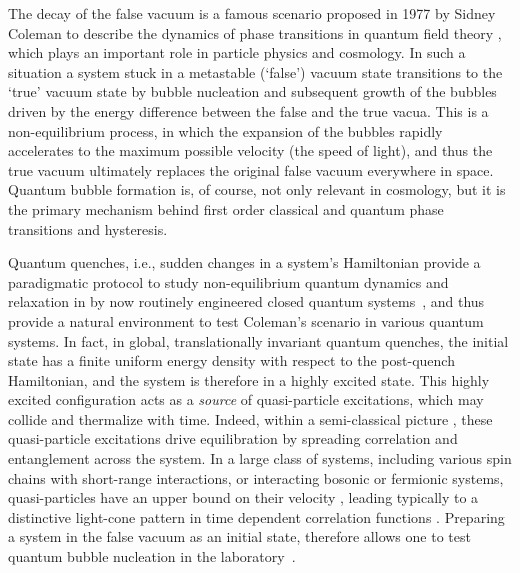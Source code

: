 \documentclass[amsmath,amssymb,11pt]{article}
\numberwithin{equation}{section}
\numberwithin{figure}{section}
\numberwithin{table}{section}
\begin{document}
The decay of the false vacuum is a famous scenario proposed in 1977 by Sidney Coleman to describe the dynamics of phase transitions in quantum field theory \cite{1977PhRvD..15.2929C,1977PhRvD..16.1762C}, which plays an important role in particle physics and cosmology. In such a situation a system stuck in a metastable (`false') vacuum state transitions to the `true' vacuum state by bubble nucleation and subsequent growth of the bubbles driven by the energy difference between the false and the true vacua. This is a non-equilibrium process, in which the expansion of the bubbles rapidly accelerates to the maximum possible velocity (the speed of light), and thus the true vacuum ultimately replaces the original false vacuum everywhere in space. 
Quantum bubble formation is, of course, not only relevant in cosmology, but it is the primary mechanism behind first order classical and quantum phase transitions and hysteresis. 

Quantum quenches, i.e.,  sudden changes in a system's Hamiltonian \cite{2006PhRvL..96m6801C,2007JSMTE..06....8C} provide a paradigmatic protocol to study non-equilibrium quantum dynamics and relaxation in by now routinely engineered closed quantum systems~\cite{2006Natur.440..900K,2007Natur.449..324H,2012NatPh...8..325T,2012Natur.481..484C,2013PhRvL.111e3003M,2013NatPh...9..640L,2015Sci...348..207L,2016Sci...353..794K}, and thus provide a natural environment to test Coleman's scenario in various quantum systems. In fact, in global, translationally invariant quantum quenches, the initial
state has a finite uniform energy density with respect to the post-quench
Hamiltonian, and the system is therefore in a highly excited state. 
This highly excited configuration acts as a \emph{source} of quasi-particle excitations, which may collide and thermalize with time. 
Indeed, within a semi-classical picture \cite{2006PhRvL..96m6801C}, these quasi-particle excitations drive equilibration by spreading correlation and entanglement across the system. In a large class of systems, including various spin chains
with short-range interactions,  or interacting bosonic or fermionic systems, quasi-particles have an upper bound on their velocity \cite{1972CMaPh..28..251L}, leading typically to a distinctive
light-cone pattern in time dependent correlation functions \cite{LC_Igloi,2006PhRvL..96m6801C,2007JSMTE..06....8C,LCTheor1,2009PhRvB..79o5104M,2011PhRvL.106v7203C,2014PhRvL.113r7203B,LCTheor3}. 
Preparing a system in the false vacuum as an initial state,
therefore allows one to test quantum bubble nucleation in the laboratory~\cite{2019PhRvD.100f5016B,2020PhRvA.102d3324B,Abel_2021,2021PRXQuantum.2.010350,2021arXiv210407428B}.
\end{document}
